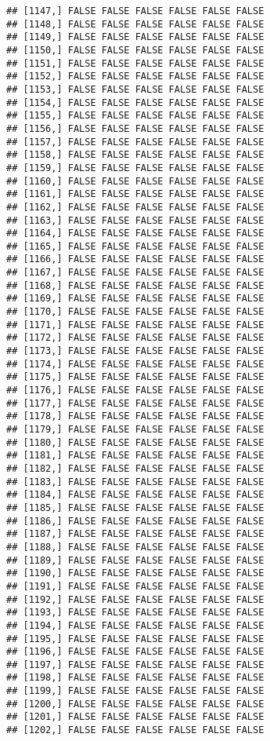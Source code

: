 \documentclass[
]{article}
\begin{document}
\begin{verbatim}
## [1147,] FALSE FALSE FALSE FALSE FALSE FALSE
## [1148,] FALSE FALSE FALSE FALSE FALSE FALSE
## [1149,] FALSE FALSE FALSE FALSE FALSE FALSE
## [1150,] FALSE FALSE FALSE FALSE FALSE FALSE
## [1151,] FALSE FALSE FALSE FALSE FALSE FALSE
## [1152,] FALSE FALSE FALSE FALSE FALSE FALSE
## [1153,] FALSE FALSE FALSE FALSE FALSE FALSE
## [1154,] FALSE FALSE FALSE FALSE FALSE FALSE
## [1155,] FALSE FALSE FALSE FALSE FALSE FALSE
## [1156,] FALSE FALSE FALSE FALSE FALSE FALSE
## [1157,] FALSE FALSE FALSE FALSE FALSE FALSE
## [1158,] FALSE FALSE FALSE FALSE FALSE FALSE
## [1159,] FALSE FALSE FALSE FALSE FALSE FALSE
## [1160,] FALSE FALSE FALSE FALSE FALSE FALSE
## [1161,] FALSE FALSE FALSE FALSE FALSE FALSE
## [1162,] FALSE FALSE FALSE FALSE FALSE FALSE
## [1163,] FALSE FALSE FALSE FALSE FALSE FALSE
## [1164,] FALSE FALSE FALSE FALSE FALSE FALSE
## [1165,] FALSE FALSE FALSE FALSE FALSE FALSE
## [1166,] FALSE FALSE FALSE FALSE FALSE FALSE
## [1167,] FALSE FALSE FALSE FALSE FALSE FALSE
## [1168,] FALSE FALSE FALSE FALSE FALSE FALSE
## [1169,] FALSE FALSE FALSE FALSE FALSE FALSE
## [1170,] FALSE FALSE FALSE FALSE FALSE FALSE
## [1171,] FALSE FALSE FALSE FALSE FALSE FALSE
## [1172,] FALSE FALSE FALSE FALSE FALSE FALSE
## [1173,] FALSE FALSE FALSE FALSE FALSE FALSE
## [1174,] FALSE FALSE FALSE FALSE FALSE FALSE
## [1175,] FALSE FALSE FALSE FALSE FALSE FALSE
## [1176,] FALSE FALSE FALSE FALSE FALSE FALSE
## [1177,] FALSE FALSE FALSE FALSE FALSE FALSE
## [1178,] FALSE FALSE FALSE FALSE FALSE FALSE
## [1179,] FALSE FALSE FALSE FALSE FALSE FALSE
## [1180,] FALSE FALSE FALSE FALSE FALSE FALSE
## [1181,] FALSE FALSE FALSE FALSE FALSE FALSE
## [1182,] FALSE FALSE FALSE FALSE FALSE FALSE
## [1183,] FALSE FALSE FALSE FALSE FALSE FALSE
## [1184,] FALSE FALSE FALSE FALSE FALSE FALSE
## [1185,] FALSE FALSE FALSE FALSE FALSE FALSE
## [1186,] FALSE FALSE FALSE FALSE FALSE FALSE
## [1187,] FALSE FALSE FALSE FALSE FALSE FALSE
## [1188,] FALSE FALSE FALSE FALSE FALSE FALSE
## [1189,] FALSE FALSE FALSE FALSE FALSE FALSE
## [1190,] FALSE FALSE FALSE FALSE FALSE FALSE
## [1191,] FALSE FALSE FALSE FALSE FALSE FALSE
## [1192,] FALSE FALSE FALSE FALSE FALSE FALSE
## [1193,] FALSE FALSE FALSE FALSE FALSE FALSE
## [1194,] FALSE FALSE FALSE FALSE FALSE FALSE
## [1195,] FALSE FALSE FALSE FALSE FALSE FALSE
## [1196,] FALSE FALSE FALSE FALSE FALSE FALSE
## [1197,] FALSE FALSE FALSE FALSE FALSE FALSE
## [1198,] FALSE FALSE FALSE FALSE FALSE FALSE
## [1199,] FALSE FALSE FALSE FALSE FALSE FALSE
## [1200,] FALSE FALSE FALSE FALSE FALSE FALSE
## [1201,] FALSE FALSE FALSE FALSE FALSE FALSE
## [1202,] FALSE FALSE FALSE FALSE FALSE FALSE

\end{verbatim}
\end{document}
